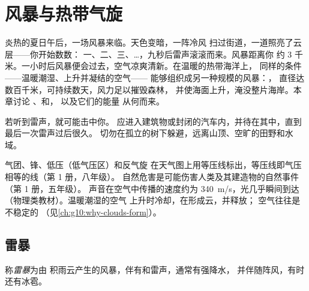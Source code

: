 \chapter{风暴与热带气旋}\label{ch:g10:storms-and-cyclones}

炎热的夏日午后，一场风暴来临。天色变暗，一阵冷风
扫过街道，一道照亮了云层——你开始数数：
一、二、三、\ldots{}，九秒后雷声滚滚而来。风暴距离你
约 3 千米。一小时后风暴便会过去，空气凉爽清新。在温暖的热带海洋上，
同样的条件——温暖潮湿、上升并凝结的空气——
能够组织成另一种规模的风暴：，
直径达数百千米，可持续数天，风力足以摧毁森林，
并使海面上升，淹没整片海岸。本章讨论
、和，
以及它们的能量
从何而来。

\begin{safety}
若听到雷声，就可能击中你。
应进入建筑物或封闭的汽车内，并待在其中，直到最后一次雷声过后很久。
切勿在孤立的树下躲避，远离山顶、空旷的田野和水域。
\end{safety}

\begin{recall}
气团、锋、低压（低气压区）和反气旋
在天气图上用等压线标出，等压线即气压相等的线（第 1 册，八年级）。
自然危害是可能伤害人类及其建造物的自然事件（第 1 册，五年级）。
声音在空气中传播的速度约为
\qty{340}{m/s}，光几乎瞬间到达（物理类教材）。温暖潮湿的空气
上升时冷却，在形成云，并释放；
空气往往是不稳定的
（见\cref{ch:g10:why-clouds-form}）。
\end{recall}

\section{雷暴}

\begin{definition}[雷暴]\label{def:g10:storms-and-cyclones:thunderstorm}
称\emph{雷暴}为由
积雨云产生的风暴，伴有和雷声，通常有强降水，
并伴随阵风，有时还有冰雹。
\end{definition}

